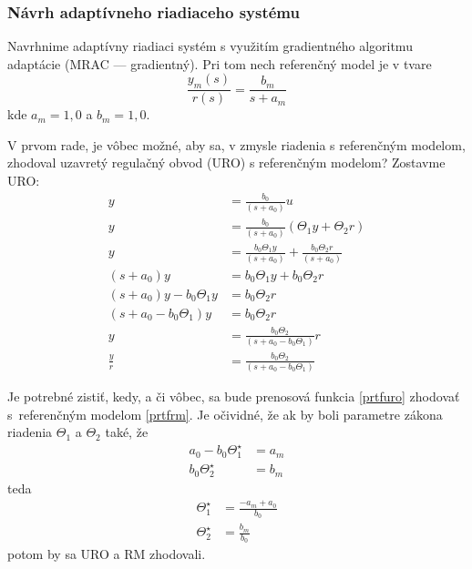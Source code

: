 \documentclass[a4paper, 10pt, ]{article}
\begin{document}
\subsubsection{Návrh adaptívneho riadiaceho systému}

Navrhnime adaptívny riadiaci systém s využitím gradientného algoritmu adaptácie (MRAC --- gradientný). Pri tom nech referenčný model je v tvare
\begin{equation} \label{prtfrm}
    \frac{y_m(s)}{r(s)} = \frac{b_m}{s + a_m}
\end{equation}
kde $a_m = 1,0$ a $b_m = 1,0$.

V prvom rade, je vôbec možné, aby sa, v zmysle riadenia s referenčným modelom, zhodoval uzavretý regulačný obvod (URO) s referenčným modelom? Zostavme URO:
\begin{subequations}
    \begin{align}
        y &= \frac{b_0}{\left( s+a_0 \right)} u \\
        y &= \frac{b_0}{\left( s+a_0 \right)} \left( \Theta_1 y + \Theta_2 r \right) \\
        y &= \frac{b_0 \Theta_1 y}{\left( s+a_0 \right)} + \frac{b_0 \Theta_2 r}{\left( s+a_0 \right)} \\
        \left( s+a_0 \right) y &= b_0 \Theta_1 y + b_0 \Theta_2 r \\
        \left( s+a_0 \right) y - b_0 \Theta_1 y &= b_0 \Theta_2 r \\
        \left( s + a_0 - b_0 \Theta_1 \right) y &= b_0 \Theta_2 r \\
        y &= \frac{b_0 \Theta_2}{\left( s + a_0 - b_0 \Theta_1 \right)} r \\
        \frac{y}{r} &= \frac{b_0 \Theta_2}{\left( s + a_0 - b_0 \Theta_1 \right)} \label{prtfuro}
    \end{align}
\end{subequations}

Je potrebné zistiť, kedy, a či vôbec, sa bude prenosová funkcia \eqref{prtfuro} zhodovať s~referenčným modelom \eqref{prtfrm}. Je očividné, že ak by boli parametre zákona riadenia $\Theta_1$ a $\Theta_2$ také, že
\begin{subequations}
    \begin{align}
        a_0 - b_0 \Theta_1^\star &= a_m \\
        b_0 \Theta_2^\star &= b_m
    \end{align}
\end{subequations}
teda
\begin{subequations} \label{prpodmz}
    \begin{align}
        \Theta_1^\star &= \frac{-a_m + a_0}{b_0}  \\
        \Theta_2^\star &= \frac{b_m}{b_0}
    \end{align}
\end{subequations}
potom by sa URO a RM zhodovali.
\end{document}
